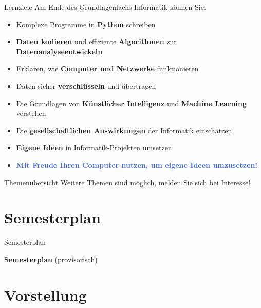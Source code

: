 \begin{frame}{Lernziele}
    Am Ende des Grundlagenfachs Informatik können Sie:
    \begin{itemize}[<+->]
        \item[\faCheckSquare] Komplexe Programme in \textbf{Python} schreiben
        \item[\faCheckSquare] \textbf{Daten kodieren} und effiziente \textbf{Algorithmen} zur \textbf{Datenanalyseentwickeln}
        \item[\faCheckSquare] Erklären, wie \textbf{Computer und Netzwerke} funktionieren
        \item[\faCheckSquare] Daten sicher \textbf{verschlüsseln} und übertragen
        \item[\faCheckSquare] Die Grundlagen von \textbf{Künstlicher Intelligenz} und \textbf{Machine Learning} verstehen
        \item[\faCheckSquare] Die \textbf{gesellschaftlichen Auswirkungen} der Informatik einschätzen
        \item[\faCheckSquare] \textbf{Eigene Ideen} in Informatik-Projekten umsetzen
        \item[\faCheckSquare] \textcolor{RoyalBlue}{\textbf{Mit Freude Ihren Computer nutzen, um eigene Ideen umzusetzen!}}
    \end{itemize}
\end{frame}

\begin{frame}{Themenübersicht}
    Weitere Themen sind möglich, melden Sie sich bei Interesse!
\end{frame}

\section{Semesterplan}
\begin{frame}{Semesterplan}
    \begin{center}
        \faFileExcel{} \textbf{Semesterplan} (provisorisch)
    \end{center}
\end{frame}

\section{Vorstellung}


